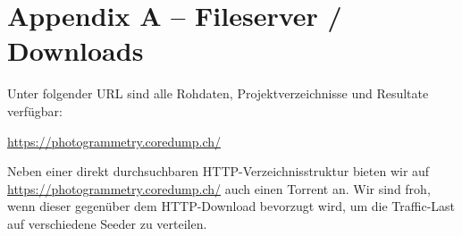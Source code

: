 \chapter{Appendix A -- Fileserver / Downloads}

\label{fileserver}

Unter folgender URL sind alle Rohdaten, Projektverzeichnisse und Resultate
verfügbar:

\vspace{1em}
\noindent\url{https://photogrammetry.coredump.ch/}
\vspace{1em}

\noindent Neben einer direkt durchsuchbaren HTTP-Verzeichnisstruktur bieten wir
auf \url{https://photogrammetry.coredump.ch/} auch
einen Torrent an. Wir sind froh, wenn dieser gegenüber dem HTTP-Download
bevorzugt wird, um die Traffic-Last auf verschiedene Seeder zu verteilen.
